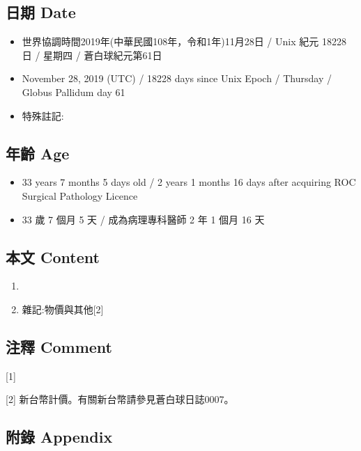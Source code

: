 \documentclass[
]{article}
\providecommand{\tightlist}{%
  \setlength{\itemsep}{0pt}\setlength{\parskip}{0pt}}
\begin{document}
\hypertarget{ux65e5ux671f-date-27}{%
\subsection{日期 Date}\label{ux65e5ux671f-date-27}}

\begin{itemize}
\tightlist
\item
  世界協調時間2019年(中華民國108年，令和1年)11月28日 / Unix 紀元 18228
  日 / 星期四 / 蒼白球紀元第61日
\item
  November 28, 2019 (UTC) / 18228 days since Unix Epoch / Thursday /
  Globus Pallidum day 61
\item
  特殊註記:
\end{itemize}

\hypertarget{ux5e74ux9f61-age-27}{%
\subsection{年齡 Age}\label{ux5e74ux9f61-age-27}}

\begin{itemize}
\tightlist
\item
  33 years 7 months 5 days old / 2 years 1 months 16 days after
  acquiring ROC Surgical Pathology Licence
\item
  33 歲 7 個月 5 天 / 成為病理專科醫師 2 年 1 個月 16 天
\end{itemize}

\hypertarget{ux672cux6587-content-27}{%
\subsection{本文 Content}\label{ux672cux6587-content-27}}

\begin{enumerate}
\def\labelenumi{\arabic{enumi}.}
\item
\item
  雜記:物價與其他{[}2{]}
\end{enumerate}

\hypertarget{ux6ce8ux91cb-comment-27}{%
\subsection{注釋 Comment}\label{ux6ce8ux91cb-comment-27}}

{[}1{]}

{[}2{]} 新台幣計價。有關新台幣請參見蒼白球日誌0007。

\hypertarget{ux9644ux9304-appendix-27}{%
\subsection{附錄 Appendix}\label{ux9644ux9304-appendix-27}}
\end{document}
